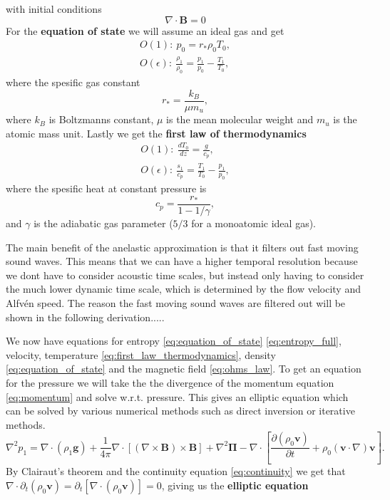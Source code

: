 with initial conditions
\begin{equation}
    \nabla\cdot\mathbf{B}=0
\end{equation}
For the \textbf{equation of state} we will assume an ideal gas and get
\begin{align}\label{eq:equation_of_state}
    O(1):\ p_0=r_*\rho_0T_0,\\
    O(\epsilon):\ \frac{\rho_1}{\rho_0}=\frac{p_1}{p_0}-\frac{T_1}{T_0},
\end{align}
where the spesific gas constant
\begin{equation}
    r_* = \frac{k_B}{\mu m_u},
\end{equation}
where $k_B$ is Boltzmanns constant, $\mu$ is the mean molecular weight and $m_u$ is the atomic mass unit. Lastly we get the \textbf{first law of thermodynamics}
\begin{align}\label{eq:first_law_thermodynamics}
    O(1):\ \frac{dT_0}{dz} = \frac{g}{c_p},\\
    O(\epsilon):\ \frac{s_1}{c_p} = \frac{T_1}{T_0}-\frac{p_1}{p_0},
\end{align}
where the spesific heat at constant pressure is
\begin{equation}
    c_p = \frac{r_*}{1-1/\gamma},
\end{equation}
and $\gamma$ is the adiabatic gas parameter ($5/3$ for a monoatomic ideal gas).

The main benefit of the anelastic approximation is that it filters out fast moving sound waves. This means that we can have a higher temporal resolution because we dont have to consider acoustic time scales, but instead only having to consider the much lower dynamic time scale, which is determined by the flow velocity and Alfvén speed. The reason the fast moving sound waves are filtered out will be shown in the following derivation.....

We now have equations for entropy \ref{eq:equation_of_state} \ref{eq:entropy_full}, velocity, temperature \ref{eq:first_law_thermodynamics}, density \ref{eq:equation_of_state} and the magnetic field \ref{eq:ohms_law}. To get an equation for the pressure we will take the the divergence of the momentum equation \ref{eq:momentum} and solve w.r.t. pressure. This gives an elliptic equation which can be solved by various numerical methods such as direct inversion or iterative methods.
\begin{equation*}
    \nabla^2 p_1 = \nabla\cdot(\rho_1\mathbf{g}) + \frac{1}{4\pi}\nabla\cdot\left[(\nabla\times\mathbf{B})\times\mathbf{B} \right]+\nabla^2\mathbf{\Pi}-\nabla\cdot\left[\frac{\partial(\rho_0\mathbf{v})}{\partial t} +\rho_0(\mathbf{v}\cdot\nabla)\mathbf{v}\right].
\end{equation*}
By Clairaut's theorem and the continuity equation \ref{eq:continuity} we get that $\nabla\cdot\partial_t(\rho_0\mathbf{v})=\partial_t\left[\nabla\cdot(\rho_0\mathbf{v})\right]=0$, giving us the \textbf{elliptic equation}

